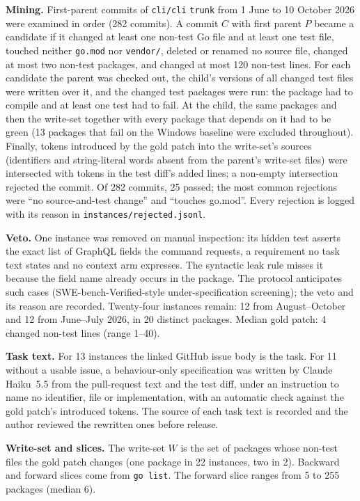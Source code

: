 \documentclass[10pt]{article}
\begin{document}
\textbf{Mining.} First-parent commits of \texttt{cli/cli} \texttt{trunk} from 1 June to 10 October 2026 were examined in order (282 commits). A commit $C$ with first parent $P$ became a candidate if it changed at least one non-test Go file and at least one test file, touched neither \texttt{go.mod} nor \texttt{vendor/}, deleted or renamed no source file, changed at most two non-test packages, and changed at most 120 non-test lines. For each candidate the parent was checked out, the child's versions of all changed test files were written over it, and the changed test packages were run: the package had to compile and at least one test had to fail. At the child, the same packages and then the write-set together with every package that depends on it had to be green (13 packages that fail on the Windows baseline were excluded throughout). Finally, tokens introduced by the gold patch into the write-set's sources (identifiers and string-literal words absent from the parent's write-set files) were intersected with tokens in the test diff's added lines; a non-empty intersection rejected the commit. Of 282 commits, 25 passed; the most common rejections were ``no source-and-test change'' and ``touches go.mod''. Every rejection is logged with its reason in \texttt{instances/rejected.jsonl}.

\textbf{Veto.} One instance was removed on manual inspection: its hidden test asserts the exact list of GraphQL fields the command requests, a requirement no task text states and no context arm expresses. The syntactic leak rule misses it because the field name already occurs in the package. The protocol anticipates such cases (SWE-bench-Verified-style under-specification screening); the veto and its reason are recorded. Twenty-four instances remain: 12 from August--October and 12 from June--July 2026, in 20 distinct packages. Median gold patch: 4 changed non-test lines (range 1--40).

\textbf{Task text.} For 13 instances the linked GitHub issue body is the task. For 11 without a usable issue, a behaviour-only specification was written by Claude Haiku~5.5 from the pull-request text and the test diff, under an instruction to name no identifier, file or implementation, with an automatic check against the gold patch's introduced tokens. The source of each task text is recorded and the author reviewed the rewritten ones before release.

\textbf{Write-set and slices.} The write-set $W$ is the set of packages whose non-test files the gold patch changes (one package in 22 instances, two in 2). Backward and forward slices come from \texttt{go list}. The forward slice ranges from 5 to 255 packages (median 6).
\end{document}
